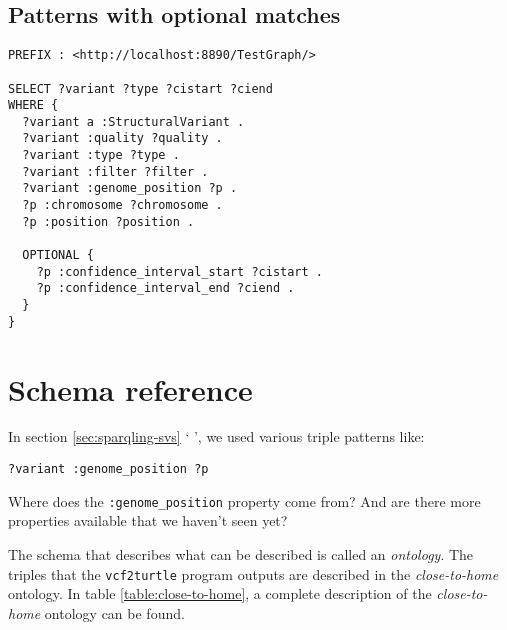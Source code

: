 \documentclass[11pt,a4paper,oneside]{book}
\begin{document}
\subsection{Patterns with optional matches}
\begin{siderules}
\begin{verbatim}
PREFIX : <http://localhost:8890/TestGraph/>

SELECT ?variant ?type ?cistart ?ciend
WHERE {
  ?variant a :StructuralVariant .
  ?variant :quality ?quality .
  ?variant :type ?type .
  ?variant :filter ?filter .
  ?variant :genome_position ?p .
  ?p :chromosome ?chromosome .
  ?p :position ?position .

  OPTIONAL {
    ?p :confidence_interval_start ?cistart .
    ?p :confidence_interval_end ?ciend .
  }
}
\end{verbatim}
\end{siderules}



\section{Schema reference}

  In section \ref{sec:sparqling-svs} {\color{LinkGray}`%
  '}, we used various triple patterns like:

\begin{siderules}
\begin{verbatim}
?variant :genome_position ?p
\end{verbatim}
\end{siderules}

  Where does the \texttt{:genome\_position} property come from?  And are
  there more properties available that we haven't seen yet?

  The schema that describes what can be described is called an \emph{ontology}.
  The triples that the \texttt{vcf2turtle} program outputs are described in
  the \emph{close-to-home} ontology.  In table \ref{table:close-to-home}, a
  complete description of the \emph{close-to-home} ontology can be found.
\end{document}
